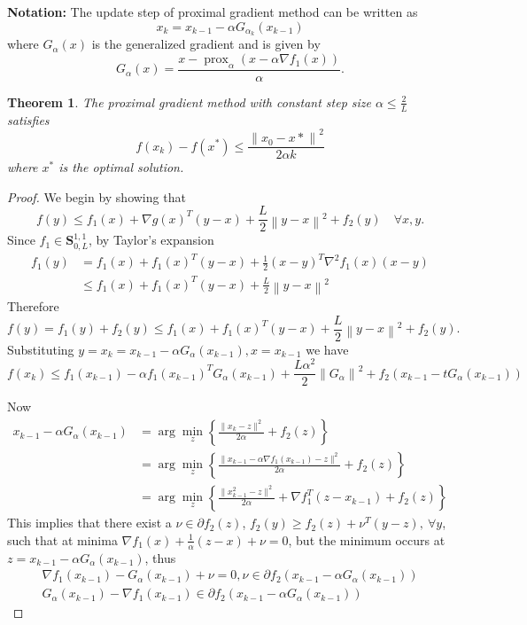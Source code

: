 \documentclass[12pt]{article}
\theoremstyle{mystyle}
\newtheorem{thm}[equation]{Theorem}
\begin{document}
\textbf{Notation: }The update step of proximal gradient method can be written as
$$x_k = x_{k-1} - \alpha G_{\alpha_k}(x_{k-1})$$ 
where $G_\alpha (x)$ is the generalized gradient and is given by 
$$G_\alpha (x)= \frac{x- \operatorname{prox}_\alpha (x - \alpha \nabla f_1(x))}{\alpha}.$$

\begin{thm}The proximal gradient method with constant step size $\alpha \leq \frac{2}{L}$ satisfies
    $$
    f\left(x_k\right)-f\left(x^*\right) \leq \frac{\left\|x_0-x*\right\|^2}{2 \alpha k}
    $$
where $x^*$ is the optimal solution.
\end{thm}
\begin{proof}
We begin by showing that 
$$f(y) \leq f_1(x) + \nabla g(x)^T(y-x) + \frac{L}{2}\left\|y-x\right\|^2 + f_2(y) \quad \forall x,y.$$
Since $f_1 \in \mathbf{S}^{1,1}_{0,L}$, by Taylor's expansion
\begin{align*}
    f_1(y) &= f_1(x)+ f_1(x)^T(y-x) + \frac{1}{2}(x-y)^T\nabla^2f_1(x)(x-y)\\
    &\leq f_1(x) + f_1(x)^T(y-x)  + \frac{L}{2} \left\|y-x\right\|^2
\end{align*}
Therefore
$$f(y) = f_1(y) + f_2(y) \leq f_1(x) + f_1(x)^T(y-x)  + \frac{L}{2} \left\|y-x\right\|^2 + f_2(y) .$$
Substituting $y = x_k = x_{k-1} - \alpha G_\alpha (x_{k-1}), x = x_{k-1}$ we have 
\begin{equation}\label{f1con}
    f(x_k) \leq f_1(x_{k-1}) - \alpha f_1(x_{k-1})^TG_\alpha (x_{k-1})  + \frac{L\alpha^2}{2} \left\|G_\alpha \right\|^2 + f_2(x_{k-1} - tG_\alpha(x_{k-1})) 
\end{equation}

Now 
\begin{align*}
    x_{k-1} - \alpha G_\alpha(x_{k-1}) &= \arg \min\limits_z\left\{\frac{\|x_k-z\|^2}{2 \alpha}+f_2(z)\right\}\\
    &= \arg \min\limits_z\left\{\frac{\|x_{k-1} - \alpha \nabla f_1(x_{k-1}) -z\|^2}{2 \alpha}+f_2(z)\right\}\\
    &= \arg \min\limits_z \left\{\frac{\|x_{k-1}^2 -z\|^2}{2 \alpha}+ \nabla f_1^T(z- x_{k-1})+ f_2(z)\right\}
\end{align*}
This implies that there exist a $\nu \in \partial f_2(z)$, $f_2(y) \geq f_2(z) + \nu^T(y-z),\ \forall y$, such that at minima $\nabla f_1(x) + \frac{1}{\alpha} (z-x) + \nu =0$,
but the minimum occurs at $z = x_{k-1} - \alpha G_\alpha (x_{k-1})$, thus
\begin{align*}
\nabla f_1(x_{k-1}) - G_\alpha (x_{k-1}) + \nu = 0, \nu \in \partial f_2(x_{k-1} - \alpha G_\alpha (x_{k-1}))\\
G_\alpha(x_{k-1}) - \nabla f_1(x_{k-1}) \in \partial f_2(x_{k-1} - \alpha G_\alpha (x_{k-1}))
\end{align*}


\end{proof}
\end{document}
